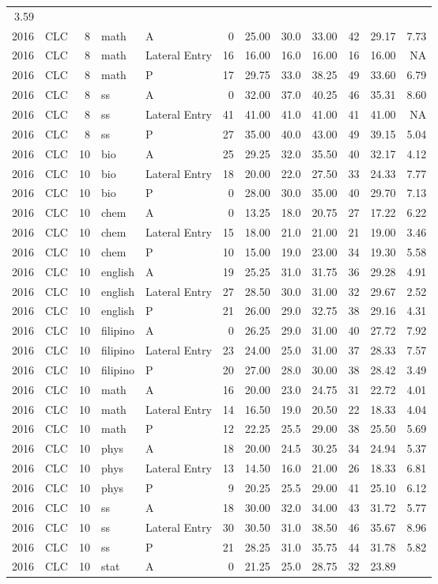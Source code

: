 \documentclass[]{article}
\begin{document}
\begin{longtable}[]{@{}rlrllrrrrrrr@{}}
3.59\tabularnewline
2016 & CLC & 8 & math & A & 0 & 25.00 & 30.0 & 33.00 & 42 & 29.17 &
7.73\tabularnewline
2016 & CLC & 8 & math & Lateral Entry & 16 & 16.00 & 16.0 & 16.00 & 16 &
16.00 & NA\tabularnewline
2016 & CLC & 8 & math & P & 17 & 29.75 & 33.0 & 38.25 & 49 & 33.60 &
6.79\tabularnewline
2016 & CLC & 8 & ss & A & 0 & 32.00 & 37.0 & 40.25 & 46 & 35.31 &
8.60\tabularnewline
2016 & CLC & 8 & ss & Lateral Entry & 41 & 41.00 & 41.0 & 41.00 & 41 &
41.00 & NA\tabularnewline
2016 & CLC & 8 & ss & P & 27 & 35.00 & 40.0 & 43.00 & 49 & 39.15 &
5.04\tabularnewline
2016 & CLC & 10 & bio & A & 25 & 29.25 & 32.0 & 35.50 & 40 & 32.17 &
4.12\tabularnewline
2016 & CLC & 10 & bio & Lateral Entry & 18 & 20.00 & 22.0 & 27.50 & 33 &
24.33 & 7.77\tabularnewline
2016 & CLC & 10 & bio & P & 0 & 28.00 & 30.0 & 35.00 & 40 & 29.70 &
7.13\tabularnewline
2016 & CLC & 10 & chem & A & 0 & 13.25 & 18.0 & 20.75 & 27 & 17.22 &
6.22\tabularnewline
2016 & CLC & 10 & chem & Lateral Entry & 15 & 18.00 & 21.0 & 21.00 & 21
& 19.00 & 3.46\tabularnewline
2016 & CLC & 10 & chem & P & 10 & 15.00 & 19.0 & 23.00 & 34 & 19.30 &
5.58\tabularnewline
2016 & CLC & 10 & english & A & 19 & 25.25 & 31.0 & 31.75 & 36 & 29.28 &
4.91\tabularnewline
2016 & CLC & 10 & english & Lateral Entry & 27 & 28.50 & 30.0 & 31.00 &
32 & 29.67 & 2.52\tabularnewline
2016 & CLC & 10 & english & P & 21 & 26.00 & 29.0 & 32.75 & 38 & 29.16 &
4.31\tabularnewline
2016 & CLC & 10 & filipino & A & 0 & 26.25 & 29.0 & 31.00 & 40 & 27.72 &
7.92\tabularnewline
2016 & CLC & 10 & filipino & Lateral Entry & 23 & 24.00 & 25.0 & 31.00 &
37 & 28.33 & 7.57\tabularnewline
2016 & CLC & 10 & filipino & P & 20 & 27.00 & 28.0 & 30.00 & 38 & 28.42
& 3.49\tabularnewline
2016 & CLC & 10 & math & A & 16 & 20.00 & 23.0 & 24.75 & 31 & 22.72 &
4.01\tabularnewline
2016 & CLC & 10 & math & Lateral Entry & 14 & 16.50 & 19.0 & 20.50 & 22
& 18.33 & 4.04\tabularnewline
2016 & CLC & 10 & math & P & 12 & 22.25 & 25.5 & 29.00 & 38 & 25.50 &
5.69\tabularnewline
2016 & CLC & 10 & phys & A & 18 & 20.00 & 24.5 & 30.25 & 34 & 24.94 &
5.37\tabularnewline
2016 & CLC & 10 & phys & Lateral Entry & 13 & 14.50 & 16.0 & 21.00 & 26
& 18.33 & 6.81\tabularnewline
2016 & CLC & 10 & phys & P & 9 & 20.25 & 25.5 & 29.00 & 41 & 25.10 &
6.12\tabularnewline
2016 & CLC & 10 & ss & A & 18 & 30.00 & 32.0 & 34.00 & 43 & 31.72 &
5.77\tabularnewline
2016 & CLC & 10 & ss & Lateral Entry & 30 & 30.50 & 31.0 & 38.50 & 46 &
35.67 & 8.96\tabularnewline
2016 & CLC & 10 & ss & P & 21 & 28.25 & 31.0 & 35.75 & 44 & 31.78 &
5.82\tabularnewline
2016 & CLC & 10 & stat & A & 0 & 21.25 & 25.0 & 28.75 & 32 & 23.89 &

\end{longtable}
\end{document}
